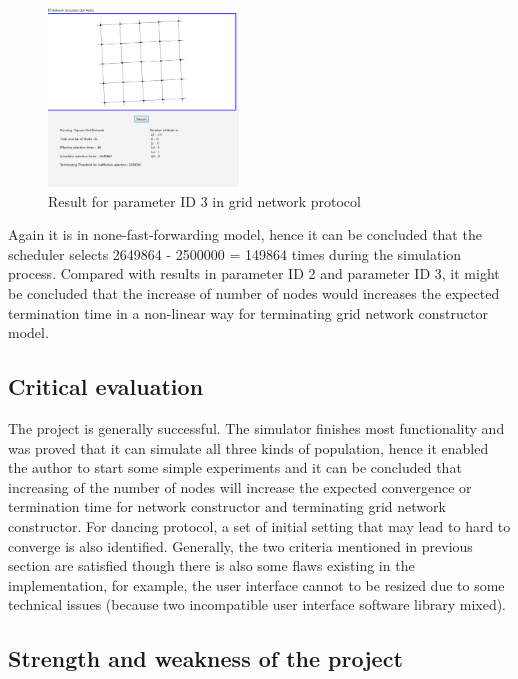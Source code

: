 \begin{figure}[H]
\begin{center}
\includegraphics[width =0.45\textwidth]{context/diagram/GridNetwork_NoneFastForwarding24_Partial.png}
\caption{Result for parameter ID 3 in grid network protocol}
\label{capture_grid_res3}
\end{center}
\end{figure}
\par\noindent
Again it is in none-fast-forwarding model, hence it can be concluded that the scheduler selects 2649864 - 2500000 = 149864 times during the simulation process.
Compared with results in parameter ID 2 and parameter ID 3, it might be concluded that the increase of number of nodes would increases the expected termination time in a non-linear way for terminating grid network constructor model.

\subsection{Critical evaluation}
The project is generally successful. The simulator finishes most functionality and was proved that it can simulate all three kinds of population,
hence it enabled the author to start some simple experiments and it can be concluded that increasing of the
number of nodes will increase the expected convergence or termination time for network constructor and terminating grid network constructor.
For dancing protocol, a set of initial setting that may lead to hard to converge is also identified.
Generally, the two criteria mentioned in previous section are satisfied though there is also some flaws existing in the implementation, for example,
the user interface cannot to be resized due to some technical issues (because two incompatible user interface software library mixed).

\subsection{Strength and weakness of the project}
\par\noindent
